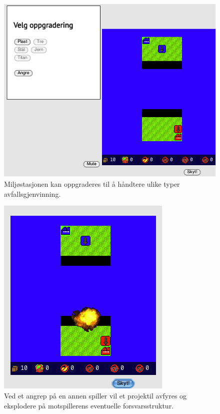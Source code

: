 \begin{center}
	\begin{figure}
		\includegraphics[width=\textwidth]{images/Oppgradering.png}
		\caption{Miljøstasjonen kan oppgraderes til å håndtere ulike typer avfallsgjenvinning.}
		\label{fig:Oppgradering}
	\end{figure}
\end{center}

\begin{center}
	\begin{figure}
		\includegraphics{images/Eksplosjon.png}
		\caption{Ved et angrep på en annen spiller vil et projektil avfyres og eksplodere på motspillerens eventuelle forsvarsstruktur.}
		\label{fig:Eksplosjon}
	\end{figure}
\end{center}

